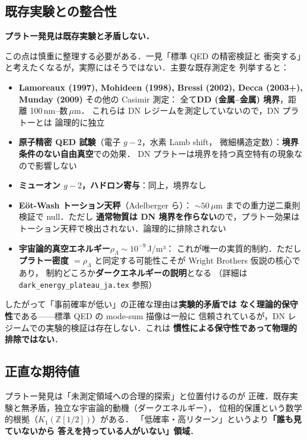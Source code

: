 \documentclass[11pt,a4paper]{article}
\begin{document}
\subsection{既存実験との整合性}

\textbf{プラトー発見は既存実験と矛盾しない．}

この点は慎重に整理する必要がある．一見「標準 QED の精密検証と
衝突する」と考えたくなるが，実際にはそうではない．主要な既存測定を
列挙すると：

\begin{itemize}
\item \textbf{Lamoreaux (1997), Mohideen (1998), Bressi (2002),
Decca (2003+), Munday (2009)} その他の Casimir 測定：
全て\textbf{DD (金属--金属) 境界}，距離 100\,nm--数\,$\mu$m．
これらは DN レジームを測定していないので，DN プラトーとは
論理的に独立
\item \textbf{原子精密 QED 試験}（電子 $g-2$，水素 Lamb shift，
微細構造定数）：\textbf{境界条件のない自由真空}での効果．
DN プラトーは境界を持つ真空特有の現象なので影響しない
\item \textbf{ミューオン $g-2$，ハドロン寄与}：同上，境界なし
\item \textbf{Eöt-Wash トーション天秤}（Adelberger ら）：
$\sim 50\,\mu$m までの重力逆二乗則検証で null．ただし
\textbf{通常物質は DN 境界を作らない}ので，プラトー効果は
トーション天秤で検出されない．論理的に排除されない
\item \textbf{宇宙論的真空エネルギー}$\rho_\Lambda \sim 10^{-9}$\,J/m³：
これが唯一の実質的制約．ただし\textbf{プラトー密度 $=\rho_\Lambda$}
と同定する可能性こそが Wright Brothers 仮説の核心であり，
制約どころか\textbf{ダークエネルギーの説明}となる
（詳細は \texttt{dark\_energy\_plateau\_ja.tex} 参照）
\end{itemize}

したがって「事前確率が低い」の正確な理由は\textbf{実験的矛盾では
なく理論的保守性}である——標準 QED の mode-sum 描像は一般に
信頼されているが，DN レジームでの実験的検証は存在しない．これは
\textbf{慣性による保守性であって物理的排除ではない}．

\subsection{正直な期待値}

プラトー発見は「未測定領域への合理的探索」と位置付けるのが
正確．既存実験と無矛盾，独立な宇宙論的動機（ダークエネルギー），
位相的保護という数学的根拠（$K_1(\mathbb Z[1/2])$）がある．
「低確率・高リターン」というより\textbf{「誰も見ていないから
答えを持っている人がいない」領域}．
\end{document}
